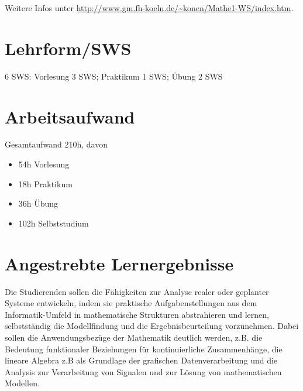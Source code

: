 Weitere Infos unter
\url{http://www.gm.fh-koeln.de/~konen/Mathe1-WS/index.htm}.

\hypertarget{lehrformswspathlabelmi-2017modulbeschreibungen-bachelorba_mathematik1}{%
\section*{Lehrform/SWS\label{/mi-2017/modulbeschreibungen-bachelor/BA_Mathematik1}}\label{lehrformswspathlabelmi-2017modulbeschreibungen-bachelorba_mathematik1}}

6 SWS: Vorlesung 3 SWS; Praktikum 1 SWS; Übung 2 SWS

\hypertarget{arbeitsaufwandpathlabelmi-2017modulbeschreibungen-bachelorba_mathematik1}{%
\section*{Arbeitsaufwand\label{/mi-2017/modulbeschreibungen-bachelor/BA_Mathematik1}}\label{arbeitsaufwandpathlabelmi-2017modulbeschreibungen-bachelorba_mathematik1}}

Gesamtaufwand 210h, davon

\begin{itemize}
\tightlist
\item
  54h Vorlesung
\item
  18h Praktikum
\item
  36h Übung
\item
  102h Selbststudium
\end{itemize}

\hypertarget{angestrebte-lernergebnissepathlabelmi-2017modulbeschreibungen-bachelorba_mathematik1}{%
\section*{Angestrebte
Lernergebnisse\label{/mi-2017/modulbeschreibungen-bachelor/BA_Mathematik1}}\label{angestrebte-lernergebnissepathlabelmi-2017modulbeschreibungen-bachelorba_mathematik1}}

Die Studierenden sollen die Fähigkeiten zur Analyse realer oder
geplanter Systeme entwickeln, indem sie praktische Aufgabenstellungen
aus dem Informatik-Umfeld in mathematische Strukturen abstrahieren und
lernen, selbstständig die Modellfindung und die Ergebnisbeurteilung
vorzunehmen. Dabei sollen die Anwendungsbezüge der Mathematik deutlich
werden, z.B. die Bedeutung funktionaler Beziehungen für kontinuierliche
Zusammenhänge, die lineare Algebra z.B als Grundlage der grafischen
Datenverarbeitung und die Analysis zur Verarbeitung von Signalen und zur
Lösung von mathematischen Modellen.

